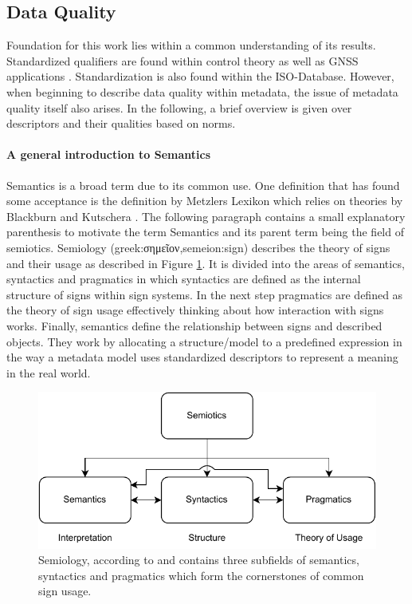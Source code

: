 \subsection{Data Quality}
Foundation for this work lies within a common understanding of its results. Standardized qualifiers are found within control theory \cite{isermann_fault-diagnosis_2011} as well as GNSS applications \cite{teunissen_springer_2017}. Standardization is also found within the ISO-Database. However, when beginning to describe data quality within metadata, the issue of metadata quality itself also arises. In the following, a brief overview is given over descriptors and their qualities based on norms.

\paragraph{A general introduction to Semantics}
Semantics is a broad term due to its common use. One definition that has found some acceptance is the definition by Metzlers Lexikon which relies on theories by Blackburn and Kutschera \cite{shoemaker_spreading_1987,kutschera_sprachphilosophie_1975}. The following paragraph contains a small explanatory parenthesis to motivate the term Semantics and its parent term being the field of semiotics. Semiology (greek:\textgreek{σημεῖον},semeion:sign) describes the theory of signs and their usage as described in Figure \ref{fig:semiotics}. It is divided into the areas of semantics, syntactics and pragmatics in which syntactics are defined as the internal structure of signs within sign systems. In the next step pragmatics are defined as the theory of sign usage effectively thinking about how interaction with signs works. Finally, semantics define the relationship between signs and described objects. They work by allocating a structure/model to a predefined expression in the way a metadata model uses standardized descriptors to represent a meaning in the real world.

\begin{figure}[h]
    \centering
    \includegraphics[width=.7\textwidth]{03_figures/semiotics.pdf}
    \caption[A semiology overview]{Semiology, according to \textcite{kutschera_sprachphilosophie_1975} and \textcite{shoemaker_spreading_1987} contains three subfields of semantics, syntactics and pragmatics which form the cornerstones of common sign usage.}
    \label{fig:semiotics}
\end{figure}

